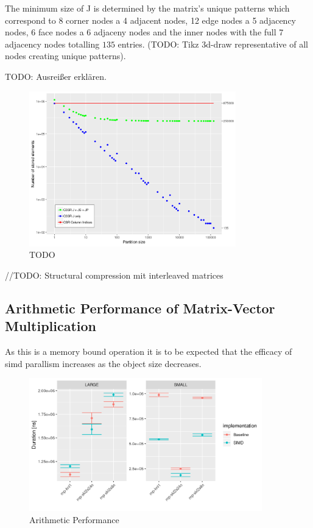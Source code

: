 \documentclass{article}
\begin{document}
    The minimum size of J is determined by the matrix's unique patterns which correspond to 8 corner
    nodes a 4 adjacent nodes, 12 edge nodes a 5 adjacency nodes, 6 face nodes a 6 adjaceny nodes and
    the inner nodes with the full 7 adjacency nodes totalling $135$ entries. (TODO: Tikz 3d-draw
    representative of all nodes creating unique patterns).

    TODO: Ausreißer erklären.
    \begin{figure}[ht]
      \centering
      \includegraphics[width=0.8\textwidth]{fig/structural-compression}
      \caption*{TODO}
    \end{figure}

    //TODO: Structural compression mit interleaved matrices

  \subsection{Arithmetic Performance of Matrix-Vector Multiplication}

    As this is a memory bound operation it is to be expected that the efficacy of simd parallism increases as the object size decreases.

    \begin{figure}[!ht]
      \centering
      \includegraphics[width=0.9\textwidth]{assets/arithmetic_performance}
      \caption{Arithmetic Performance}
    \end{figure}
\end{document}
